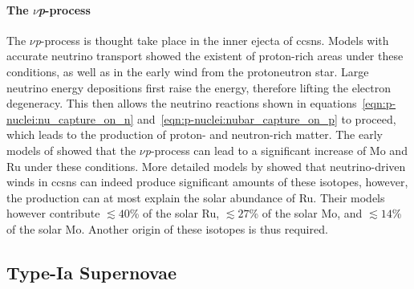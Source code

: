 \paragraph{The $\nu$\textit{p}-process}
The $\nu$\textit{p}-process is thought take place in the inner ejecta of \acp{ccsn}. Models with accurate neutrino transport showed the existent of proton-rich areas under these conditions, as well as in the early wind from the protoneutron star. Large neutrino energy depositions first raise the energy, therefore lifting the electron degeneracy. This then allows the neutrino reactions shown in equations~\eqref{eqn:p-nuclei:nu_capture_on_n} and~\eqref{eqn:p-nuclei:nubar_capture_on_p} to proceed, which leads to the production of proton- and neutron-rich matter. The early models of \citet{frohlich06} showed that the $\nu$\textit{p}-process can lead to a significant increase of Mo and Ru under these conditions. More detailed models by \citet{bliss18} showed that neutrino-driven winds in \acp{ccsn} can indeed produce significant amounts of these isotopes, however, the production can at most explain the solar abundance of Ru. Their models however contribute $\lesssim40$\% of the solar Ru, $\lesssim27$\% of the solar Mo, and $\lesssim14$\% of the solar Mo. Another origin of these isotopes is thus required.



\subsection{Type-Ia Supernovae}

